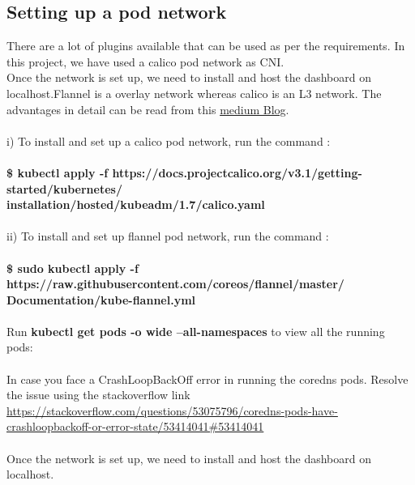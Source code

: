 \documentclass[12pt]{report}
\begin{document}
\subsection{Setting up a pod network}
There are a lot of plugins available that can be used as per the requirements. In this project, we have used a calico pod network as CNI.\\
Once the network is set up, we need to install and host the dashboard on localhost.Flannel is a overlay network whereas calico is an L3 network. The advantages in detail can be read from this  \href{https://medium.com/@jain.sm/flannel-vs-calico-a-battle-of-l2-vs-l3-based-networking-5a30cd0a3ebd}{medium Blog}.\\\\
i) To install and set up a calico pod network, run the command :\\\\
\textbf{\$ kubectl apply -f https://docs.projectcalico.org/v3.1/getting-started/kubernetes/\\installation/hosted/kubeadm/1.7/calico.yaml}\\\\
ii) To install and set up flannel pod network, run the command :\\\\
\textbf{\$ sudo kubectl apply -f https://raw.githubusercontent.com/coreos/flannel/master/\\Documentation/kube-flannel.yml}\\\\
Run \textbf{kubectl get pods -o wide --all-namespaces} to view all the running pods:\\\\
In case you face a CrashLoopBackOff error in running the coredns pods. Resolve the issue using the stackoverflow link \href{https://stackoverflow.com/questions/53075796/coredns-pods-have-crashloopbackoff-or-error-state/53414041#53414041}{https://stackoverflow.com/questions/53075796/coredns-pods-have-crashloopbackoff-or-error-state/53414041\#53414041}\cite{Coredns} \\\\
Once the network is set up, we need to install and host the dashboard on localhost.
\end{document}
